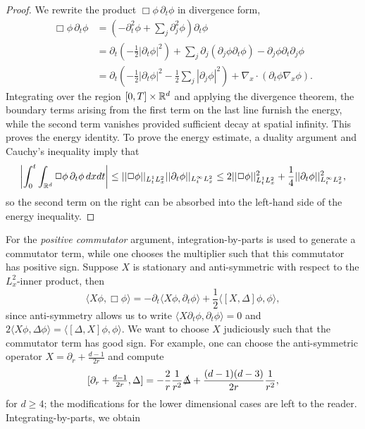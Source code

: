 \begin{proof}
	We rewrite the product $\Box \phi \, \partial_t \phi$ in divergence form, 
		\begin{align*}
			\Box \phi \, \partial_t \phi 
				&= \left( - \partial_t^2 \phi + \sum_j \partial_j^2 \phi \right) \partial_t \phi \\
				&=	\partial_t \left( - \frac12 |\partial_t \phi|^2 \right) + \sum_j \partial_j (\partial_j \phi \partial_t \phi) - \partial_j \phi \partial_t \partial_j \phi \\
				&=\partial_t \left(-\frac12 |\partial_t \phi|^2 - \frac12 \sum_j |\partial_j \phi|^2 \right) + \nabla_x \cdot (\partial_t \phi \nabla_x \phi). 
		\end{align*}
	Integrating over the region $[0, T] \times \mathbb R^d$ and applying the divergence theorem, the boundary terms arising from the first term on the last line furnish the energy, while the second term vanishes provided sufficient decay at spatial infinity. This proves the energy identity. To prove the energy estimate, a duality argument and Cauchy's inequality imply that 
		\[
			\left|\int_0^t \int_{\mathbb R^d} \Box \phi \, \partial_t \phi \, dx dt\right| \leq ||\Box \phi||_{L^1_t L^2_x} ||\partial_t \phi||_{L^\infty_t L^2_x}  \leq 2||\Box \phi||_{L^1_t L^2_x}^2 + \frac14||\partial_t \phi||_{L^\infty_t L^2_x}^2,
		\]
	so the second term on the right can be absorbed into the left-hand side of the energy inequality. 
\end{proof}


For the \textit{positive commutator} argument, integration-by-parts is used to generate a commutator term, while one chooses the multiplier such that this commutator has positive sign. Suppose $X$ is stationary and anti-symmetric with respect to the $L^2_x$-inner product, then
	\[
		\langle X \phi, \Box \phi \rangle =  -\partial_t \langle X \phi, \partial_t \phi\rangle  + \frac12 \langle [X, \Delta] \phi, \phi \rangle,
	\]
since anti-symmetry allows us to write $\langle X\partial_t \phi, \partial_t \phi \rangle = 0$ and $2 \langle X \phi, \Delta \phi \rangle =\langle [\Delta, X] \phi, \phi \rangle$. We want to choose $X$ judiciously such that the commutator term has good sign. For example, one can choose the anti-symmetric operator $X = \partial_r + \tfrac{d - 1}{2r}$ and compute
	\[
		[\partial_r + \tfrac{d - 1}{2r}, \Delta] = - \frac2r \frac1{r^2} \slashed \Delta + \frac{(d - 1) (d - 3)}{2r} \frac{1}{r^2},
	\]
for $d \geq 4$; the modifications for the lower dimensional cases are left to the reader. Integrating-by-parts, we obtain

